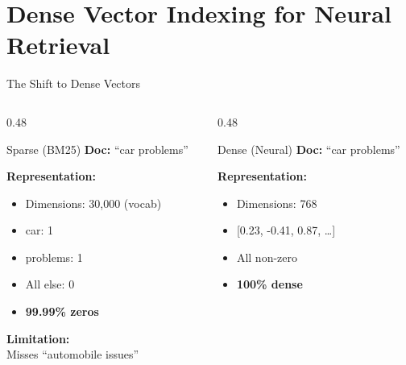 \documentclass[aspectratio=169]{beamer}
\newif\ifanimated
\newcommand{\cpause}{\ifanimated\pause\fi}
\begin{document}
\section{Dense Vector Indexing for Neural Retrieval}

\begin{frame}[shrink=10]{The Shift to Dense Vectors}
\begin{columns}
\begin{column}{0.48\textwidth}
\begin{block}{Sparse (BM25)}
\textbf{Doc:} ``car problems''

\vspace{0.5em}

\textbf{Representation:}
\begin{itemize}
    \item Dimensions: 30,000 (vocab)
    \item car: 1
    \item problems: 1
    \item All else: 0
    \item \textbf{99.99\% zeros}
\end{itemize}

\vspace{0.5em}

\textbf{Limitation:} \\
Misses ``automobile issues''
\end{block}
\cpause
\end{column}

\begin{column}{0.48\textwidth}
\begin{block}{Dense (Neural)}
\textbf{Doc:} ``car problems''

\vspace{0.5em}

\textbf{Representation:}
\begin{itemize}
    \item Dimensions: 768
    \item {[0.23, -0.41, 0.87, \dots]}
    \item All non-zero
    \item \textbf{100\% dense}
\end{itemize}

\vspace{0.5em}


\end{block}
\end{column}
\end{columns}
\end{frame}
\end{document}
